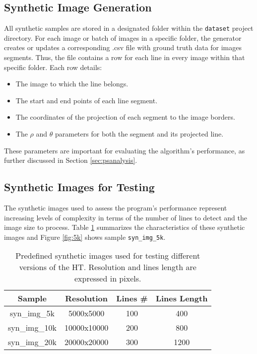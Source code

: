 \documentclass[conference]{IEEEtran}
\begin{document}
    \subsection{Synthetic Image Generation}
    \label{subsec:image_generation}
    
        All synthetic samples are stored in a designated folder within the \texttt{dataset} project directory. For each image or batch of images in a specific folder, the generator creates or updates a corresponding .csv file with ground truth data for images segments. Thus, the file contains a row for each line in every image within that specific folder. Each row details:
        \begin{itemize}
            \item The image to which the line belongs.
            \item The start and end points of each line segment.
            \item The coordinates of the projection of each segment to the image borders.
            \item The $\rho$ and $\theta$ parameters for both the segment and its projected line.
        \end{itemize}
    
        These parameters are important for evaluating the algorithm’s performance, as further discussed in Section \ref{sec:psanalysis}.

    \subsection{Synthetic Images for Testing}
    \label{subsec:synthetic_samples}
    
        The synthetic images used to assess the program's performance represent increasing levels of complexity in terms of the number of lines to detect and the image size to process. Table \ref{tab:samples} summarizes the characteristics of these synthetic images and Figure \ref{fig:5k} shows sample \texttt{syn\_img\_5k}.
        
    
        \begin{table}[htbp]
            \centering
            \begin{tabular}{|c|c|c|c|}
            \hline
            \textbf{Sample} & \textbf{Resolution} & \textbf{Lines \#} & \textbf{Lines Length} \\
            \hline
            syn\_img\_5k & 5000x5000 & 100 & 400 \\
            \hline
            syn\_img\_10k & 10000x10000 & 200 & 800 \\ 
            \hline
            syn\_img\_20k & 20000x20000 & 300 & 1200 \\ 
            \hline
            \end{tabular}
            \caption{Predefined synthetic images used for testing different versions of the HT. Resolution and lines length are expressed in pixels.}
            \label{tab:samples}
        \end{table}
    
\end{document}
